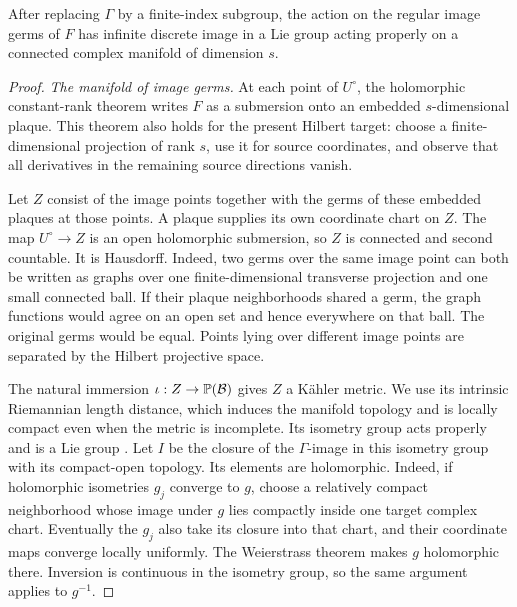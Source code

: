 \begin{proposition}\label{hi:discrete-monodromy}
After replacing \(\Gamma\) by a finite-index subgroup, the action on
the regular image germs of \(F\) has infinite discrete image in a
Lie group acting properly on a connected complex manifold of
dimension \(s\).
\end{proposition}

\begin{proof}
\medskip\noindent\emph{The manifold of image germs.}
At each point of \(U^\circ\), the holomorphic constant-rank theorem
writes \(F\) as a submersion onto an embedded \(s\)-dimensional
plaque. This theorem also holds for the present Hilbert target:
choose a finite-dimensional projection of rank \(s\), use it for
source coordinates, and observe that all derivatives in the
remaining source directions vanish.

Let \(Z\) consist of the image points together with the germs of
these embedded plaques at those points. A plaque supplies its own
coordinate chart on \(Z\). The map \(U^\circ\to Z\) is an open
holomorphic submersion, so \(Z\) is connected and second countable.
It is Hausdorff. Indeed, two germs over the same image point can
both be written as graphs over one finite-dimensional transverse
projection and one small connected ball. If their plaque
neighborhoods shared a germ, the graph functions would agree on an
open set and hence everywhere on that ball. The original germs
would be equal. Points lying over different image points are
separated by the Hilbert projective space.

The natural immersion \(\iota:Z\to\mathbb P(\mathcal B)\) gives \(Z\)
a K\"ahler metric. We use its intrinsic Riemannian length distance,
which induces the manifold topology and is locally compact even when
the metric is incomplete. Its isometry group acts properly
\cite[Corollary~4]{Manoussos2010} and is a Lie group
\cite[author's version, Theorem~6.3]{MatveevTroyanov2017}.
Let \(I\) be the closure of the \(\Gamma\)-image in this isometry
group with its compact-open topology. Its elements are holomorphic.
Indeed, if holomorphic isometries \(g_j\) converge to \(g\), choose
a relatively compact neighborhood whose image under \(g\) lies
compactly inside one target complex chart. Eventually the \(g_j\)
also take its closure into that chart, and their coordinate maps
converge locally uniformly. The Weierstrass theorem makes \(g\)
holomorphic there. Inversion is continuous in the isometry group,
so the same argument applies to \(g^{-1}\).


\end{proof}
